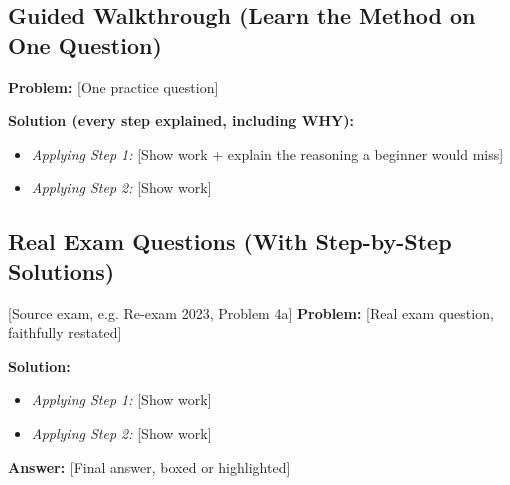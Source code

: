 \documentclass[12pt, a4paper]{article}
\begin{document}
\subsection*{Guided Walkthrough (Learn the Method on One Question)}
\textbf{Problem:} [One practice question]

\textbf{Solution (every step explained, including WHY):}
\begin{itemize}
    \item \textit{Applying Step 1:} [Show work + explain the reasoning a beginner would miss]
    \item \textit{Applying Step 2:} [Show work]
\end{itemize}

\subsection*{Real Exam Questions (With Step-by-Step Solutions)}

\begin{practicebox}{[Source exam, e.g. Re-exam 2023, Problem 4a]}
\textbf{Problem:} [Real exam question, faithfully restated]

\textbf{Solution:}
\begin{itemize}
    \item \textit{Applying Step 1:} [Show work]
    \item \textit{Applying Step 2:} [Show work]
\end{itemize}
\textbf{Answer:} [Final answer, boxed or highlighted]
\end{practicebox}


\end{document}
